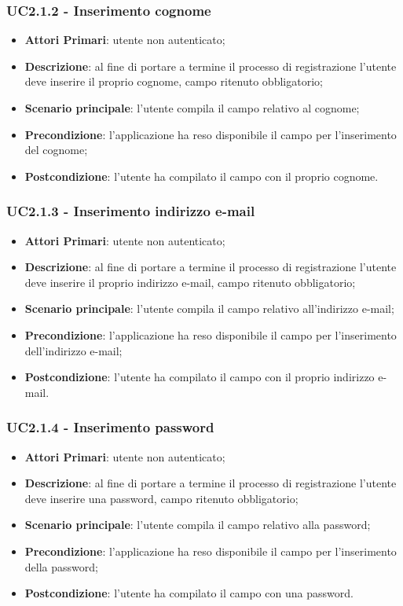 \subsubsection{UC2.1.2 - Inserimento cognome}
\begin{itemize}
	\item \textbf{Attori Primari}: utente non autenticato;
	\item \textbf{Descrizione}: al fine di portare a termine il processo di registrazione l'utente deve inserire il proprio cognome, campo ritenuto obbligatorio;
	\item \textbf{Scenario principale}: l'utente compila il campo relativo al cognome;	
	\item \textbf{Precondizione}: l'applicazione ha reso disponibile il campo per l'inserimento del cognome;
	\item \textbf{Postcondizione}: l'utente ha compilato il campo con il proprio cognome.	
\end{itemize}
\subsubsection{UC2.1.3 - Inserimento indirizzo e-mail}
\begin{itemize}
	\item \textbf{Attori Primari}: utente non autenticato;
	\item \textbf{Descrizione}: al fine di portare a termine il processo di registrazione l'utente deve inserire il proprio indirizzo e-mail, campo ritenuto obbligatorio;
	\item \textbf{Scenario principale}: l'utente compila il campo relativo all'indirizzo e-mail;	
	\item \textbf{Precondizione}: l'applicazione ha reso disponibile il campo per l'inserimento dell'indirizzo e-mail;
	\item \textbf{Postcondizione}: l'utente ha compilato il campo con il proprio indirizzo e-mail.
\end{itemize}
\subsubsection{UC2.1.4 - Inserimento password}
\begin{itemize}
	\item \textbf{Attori Primari}: utente non autenticato;
	\item \textbf{Descrizione}: al fine di portare a termine il processo di registrazione l'utente deve inserire una password, campo ritenuto obbligatorio;
	\item \textbf{Scenario principale}: l'utente compila il campo relativo alla password;	
	\item \textbf{Precondizione}: l'applicazione ha reso disponibile il campo per l'inserimento della password;
	\item \textbf{Postcondizione}: l'utente ha compilato il campo con una password.
\end{itemize}
